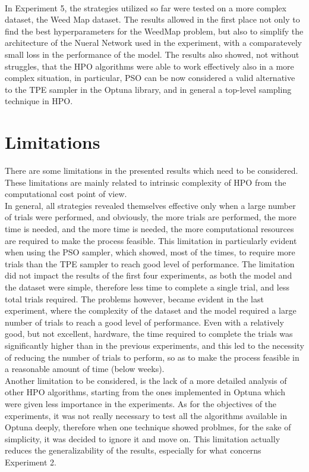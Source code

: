 \\[0.3cm]In Experiment 5, the strategies utilized so far were tested on a more complex dataset, the Weed Map dataset. The results allowed in the first place not only to find the best hyperparameters for the WeedMap problem, but also to simplify the architecture of the Nueral Network used in the experiment, with a comparatevely small loss in the performance of the model. The results also showed, not without struggles, that the HPO algorithms were able to work effectively also in a more complex situation, in particular, PSO can be now considered a valid alternative to the TPE sampler in the Optuna library, and in general a top-level sampling technique in HPO. 

\section{Limitations}

There are some limitations in the presented results which need to be considered. These limitations are mainly related to intrinsic complexity of HPO from the computational cost point of view.
\\[0.3cm]In general, all strategies revealed themselves effective only when a large number of trials were performed, and obviously, the more trials are performed, the more time is needed, and the more time is needed, the more computational resources are required to make the process feasible. This limitation in particularly evident when using the PSO sampler, which showed, most of the times, to require more trials than the TPE sampler to reach good level of performance.
The limitation did not impact the results of the first four experiments, as both the model and the dataset were simple, therefore less time to complete a single trial, and less total trials required. The problems however, became evident in the last experiment, where the complexity of the dataset and the model required a large number of trials to reach a good level of performance. Even with a relatively good, but not excellent, hardware, the time required to complete the trials was significantly higher than in the previous experiments, and this led to the necessity of reducing the number of trials to perform, so as to make the process feasible in a reasonable amount of time (below weeks).
\\[0.3cm]Another limitation to be considered, is the lack of a more detailed analysis of other HPO algorithms, starting from the ones implemented in Optuna which were given less importance in the experiments. As for the objectives of the experiments, it was not really necessary to test all the algorithms available in Optuna deeply, therefore when one technique showed problmes, for the sake of simplicity, it was decided to ignore it and move on. This limitation actually reduces the generalizability of the results, especially for what concerns Experiment 2.

